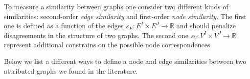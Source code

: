 
To measure a similarity between graphs one consider two different kinds of similarities: second-order \emph{edge similarity} and first-order \emph{node similarity}. The first one is defined as a function of the edges $s_E:E^I\times E^J\rightarrow\mathbb{R}$ and should penalize disagreements in the structure of two graphs. The second one $s_V:V^I\times V^J\rightarrow\mathbb{R}$ represent additional constrains on the possible node correspondences.

Below we list a different ways to define a node and edge similarities between two attributed graphs we found in the literature.
\vspace{-5pt}
